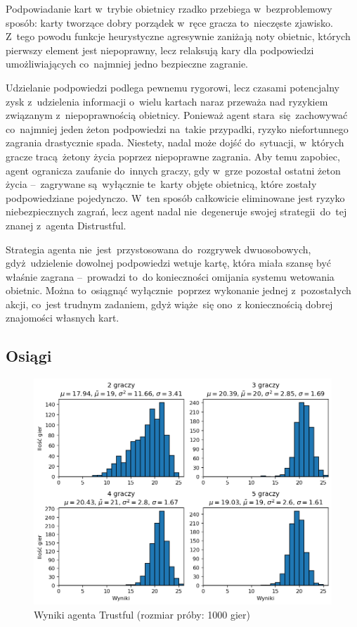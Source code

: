 \documentclass[declaration,shortabstract,inz]{iithesis}
\begin{document}
Podpowiadanie kart w~trybie obietnicy rzadko przebiega w~bezproblemowy sposób: karty tworzące dobry porządek w~ręce gracza to~nieczęste zjawisko. Z~tego powodu funkcje heurystyczne agresywnie zaniżają noty obietnic, których pierwszy element jest niepoprawny, lecz relaksują kary dla podpowiedzi umożliwiających co~najmniej jedno bezpieczne zagranie.

Udzielanie podpowiedzi podlega pewnemu rygorowi, lecz czasami potencjalny zysk z~udzielenia informacji o~wielu kartach naraz przeważa nad ryzykiem związanym z~niepoprawnością obietnicy. Ponieważ agent stara~się zachowywać co~najmniej jeden żeton podpowiedzi na~takie przypadki, ryzyko niefortunnego zagrania drastycznie spada. Niestety, nadal może dojść do~sytuacji, w~których gracze tracą żetony życia poprzez niepoprawne zagrania. Aby temu zapobiec, agent ogranicza zaufanie do~innych graczy, gdy w~grze pozostał ostatni żeton życia --~zagrywane są~wyłącznie te~karty objęte obietnicą, które zostały podpowiedziane pojedynczo. W~ten sposób całkowicie eliminowane jest ryzyko niebezpiecznych zagrań, lecz agent nadal nie~degeneruje swojej strategii do~tej znanej z~agenta Distrustful.

Strategia agenta nie~jest~przystosowana do~rozgrywek dwuosobowych, gdyż~udzielenie dowolnej podpowiedzi wetuje kartę, która miała szansę być właśnie zagrana --~prowadzi to~do konieczności omijania systemu wetowania obietnic. Można to~osiągnąć wyłącznie poprzez wykonanie jednej z~pozostałych akcji, co~jest trudnym zadaniem, gdyż wiąże~się ono~z koniecznością dobrej znajomości własnych kart.

\subsection*{Osiągi}

\begin{figure}[H]
	\centering
	\captionsetup{format=hang}
	\includegraphics[width=\textwidth,height=\textheight,keepaspectratio]{Trustful.png}
	\caption[Caption]{Wyniki agenta Trustful (rozmiar próby: 1000 gier)}
	\label{fig:Trustful}
\end{figure}
\end{document}
